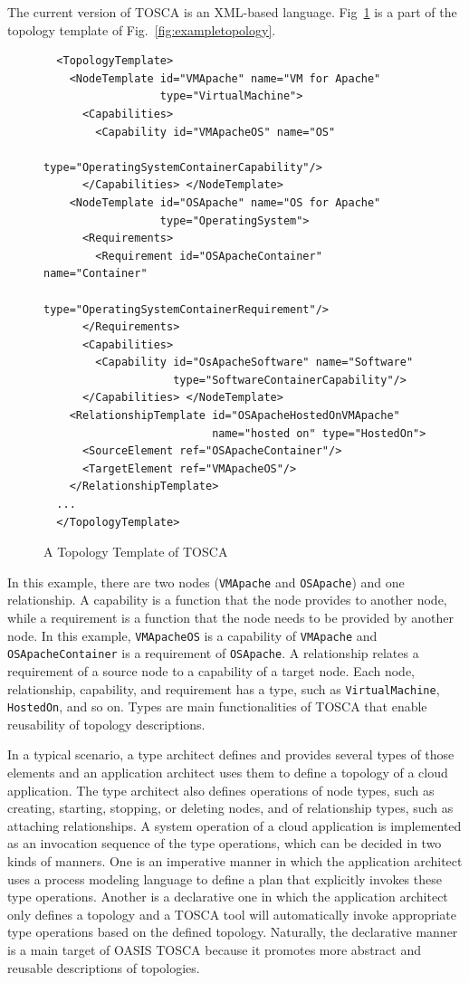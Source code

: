\documentclass[12pt]{report}
\begin{document}
The current version of TOSCA is an XML-based language. Fig~\ref{fig:topology}
is a part of the topology template of Fig.~\ref{fig:exampletopology}.
\begin{figure}
\centering
\begin{verbatim}
  <TopologyTemplate>
    <NodeTemplate id="VMApache" name="VM for Apache" 
                  type="VirtualMachine">
      <Capabilities>
        <Capability id="VMApacheOS" name="OS" 
                    type="OperatingSystemContainerCapability"/>
      </Capabilities> </NodeTemplate>
    <NodeTemplate id="OSApache" name="OS for Apache" 
                  type="OperatingSystem">
      <Requirements>
        <Requirement id="OSApacheContainer" name="Container" 
                     type="OperatingSystemContainerRequirement"/>
      </Requirements>
      <Capabilities>
        <Capability id="OsApacheSoftware" name="Software" 
                    type="SoftwareContainerCapability"/>
      </Capabilities> </NodeTemplate>
    <RelationshipTemplate id="OSApacheHostedOnVMApache"
                          name="hosted on" type="HostedOn">
      <SourceElement ref="OSApacheContainer"/>
      <TargetElement ref="VMApacheOS"/>
    </RelationshipTemplate>
  ...
  </TopologyTemplate>
\end{verbatim}
\caption{A Topology Template of TOSCA}
\label{fig:topology}
\end{figure}
In this
example, there are two nodes ({\tt VMApache} and {\tt OSApache}) and
one relationship.  A capability is a function that the node provides
to another node, while a requirement is a function that the node needs
to be provided by another node. In this example, {\tt VMApacheOS} is a
capability of {\tt VMApache} and {\tt OSApacheContainer} is a
requirement of {\tt OSApache}.  A relationship relates a requirement
of a source node to a capability of a target node.  Each node,
relationship, capability, and requirement has a type, such as
{\tt VirtualMachine}, {\tt HostedOn}, and so on. Types are main
functionalities of TOSCA that enable reusability of topology
descriptions.

In a typical scenario, a type architect defines and provides several
types of those elements and an application architect uses them to
define a topology of a cloud application. The type architect also
defines operations of node types, such as creating, starting,
stopping, or deleting nodes, and of relationship types, such as
attaching relationships. A system operation of a cloud application is
implemented as an invocation sequence of the type operations, which
can be decided in two kinds of manners. One is an imperative manner in
which the application architect uses a process modeling language to
define a plan that explicitly invokes these type operations. Another is
a declarative one in which the application architect only defines a
topology and a TOSCA tool will automatically invoke appropriate type
operations based on the defined topology. Naturally, the declarative
manner is a main target of OASIS TOSCA because it promotes more
abstract and reusable descriptions of topologies.
\end{document}
